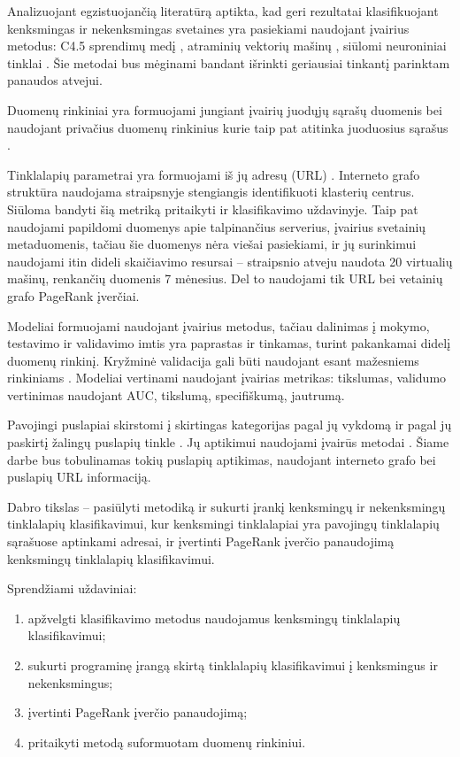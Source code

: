 Analizuojant egzistuojančią literatūrą aptikta, kad geri rezultatai klasifikuojant kenksmingas ir nekenksmingas svetaines yra pasiekiami naudojant įvairius metodus: C4.5 sprendimų medį \cite{trees}, atraminių vektorių mašinų \cite{comp}, siūlomi neuroniniai tinklai \cite{trees}. Šie metodai bus mėginami bandant išrinkti geriausiai tinkantį parinktam panaudos atvejui.

Duomenų rinkiniai yra formuojami jungiant įvairių juodųjų sąrašų duomenis bei naudojant privačius duomenų rinkinius kurie taip pat atitinka juoduosius sąrašus \cite{trees, comp, webcop}.

Tinklalapių parametrai yra formuojami iš jų adresų (URL) \cite{trees, comp}. Interneto grafo struktūra naudojama straipsnyje \cite{linchpins} stengiangis identifikuoti klasterių centrus. Siūloma bandyti šią metriką pritaikyti ir klasifikavimo uždavinyje. Taip pat naudojami papildomi duomenys apie talpinančius serverius, įvairius svetainių metaduomenis, tačiau šie duomenys nėra viešai pasiekiami, ir jų surinkimui naudojami itin dideli skaičiavimo resursai -- \cite{linchpins} straipsnio atveju naudota 20 virtualių mašinų, renkančių duomenis 7 mėnesius. Del to naudojami tik URL bei vetainių grafo PageRank įverčiai.

Modeliai formuojami naudojant įvairius metodus, tačiau dalinimas į mokymo, testavimo ir validavimo imtis yra paprastas ir tinkamas, turint pakankamai didelį duomenų rinkinį. Kryžminė validacija gali būti naudojant esant mažesniems rinkiniams \cite{trees}. Modeliai vertinami naudojant įvairias metrikas: tikslumas, validumo vertinimas naudojant AUC, tikslumą, specifiškumą, jautrumą.

\newpage
{}
Pavojingi puslapiai skirstomi į skirtingas kategorijas pagal jų vykdomą \cite{tax} ir pagal jų paskirtį žalingų puslapių tinkle \cite{linchpins}. Jų aptikimui naudojami įvairūs metodai \cite{comp}. Šiame darbe bus tobulinamas tokių puslapių aptikimas, naudojant interneto grafo bei puslapių URL informaciją.

Dabro tikslas -- pasiūlyti metodiką ir sukurti įrankį kenksmingų ir nekenksmingų tinklalapių klasifikavimui, kur kenksmingi tinklalapiai yra pavojingų tinklalapių sąrašuose aptinkami adresai, ir įvertinti PageRank įverčio panaudojimą kenksmingų tinklalapių klasifikavimui.

Sprendžiami uždaviniai:
\begin{enumerate}
    \item apžvelgti klasifikavimo metodus naudojamus kenksmingų tinklalapių klasifikavimui;
    \item sukurti programinę įrangą skirtą tinklalapių klasifikavimui į kenksmingus ir nekenksmingus;
    \item įvertinti PageRank įverčio panaudojimą;
    \item pritaikyti metodą suformuotam duomenų rinkiniui.
\end{enumerate}